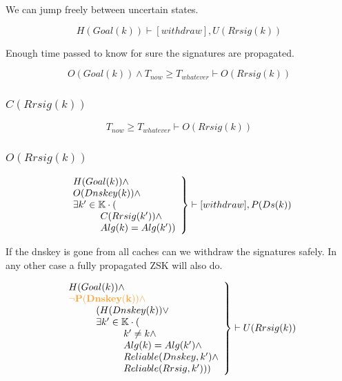 \documentclass[twoside,english, a4paper]{article}
\newcommand{\highlightMinSig}[1]{\textcolor{MinSig}{\bf{#1}}}
\newcommand{\mathbox}[1]{#1}
\begin{document}
\mathbox{

	We can jump freely between uncertain states.
	
	\begin{equation}
		H(Goal(k)) \vdash [withdraw], U(Rrsig(k))
	\end{equation}

	Enough time passed to know for sure the signatures are propagated.
	
	\begin{equation}
		O(Goal(k)) \wedge T_{now} \geq T_{whatever} \vdash O(Rrsig(k))
	\end{equation}
}


\subsubsection{$C(Rrsig(k))$}
\highlightMinSig{
	\begin{equation}
		T_{now} \geq T_{whatever} \vdash O(Rrsig(k))
	\end{equation}
}

\subsubsection{$O(Rrsig(k))$}

\mathbox{

\highlightMinSig{
	\begin{equation}
		\left.
		\begin{array}{l}
\hskip 0cm				H(Goal(k)) \wedge \\
\hskip 0cm				O(Dnskey(k)) \wedge \\
\hskip 0cm				\exists k' \in \mathbb{K} \cdot (\\
\hskip 1cm					C(Rrsig(k')) \wedge \\
\hskip 1cm					Alg(k)=Alg(k'))\\
		\end{array}
		\right\} \vdash [withdraw], P(Ds(k)) \\
	\end{equation}
	}

	If the dnskey is gone from all caches can we withdraw the 
	signatures safely. In any other case a fully propagated ZSK will 
	also do.

	\begin{equation}
		\left.
		\begin{array}{l}
\hskip 0cm			H(Goal(k)) \wedge  \\
\highlightMinSig{\hskip 0cm			\neg P(Dnskey(k)) \wedge  }\\
\hskip 1cm			(H(Dnskey(k)) \vee \\
\hskip 1cm			\exists k' \in \mathbb{K} \cdot ( \\
\hskip 2cm				k' \not = k  \wedge\\
\hskip 2cm				Alg(k) = Alg(k')  \wedge\\
\hskip 2cm				Reliable(Dnskey, k')  \wedge\\
\hskip 2cm				Reliable(Rrsig, k')))
		\end{array}
		\right\} \vdash U(Rrsig(k))
	\end{equation}
}
\end{document}
